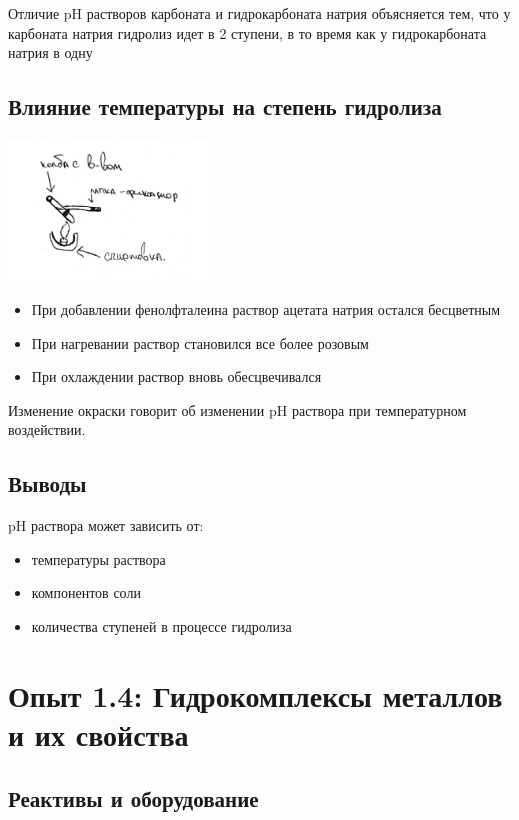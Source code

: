 \documentclass[a4paper, 12pt]{article}
\begin{document}
Отличие pH растворов карбоната и гидрокарбоната натрия объясняется тем, что у карбоната натрия гидролиз идет в 2 ступени, в то время как у гидрокарбоната натрия в одну

\subsection{Влияние температуры на степень гидролиза}
\begin{center}
	\includegraphics[width = 0.4\textwidth]{Nagrev}\\
\end{center}

\begin{itemize}
	\item При добавлении фенолфталеина раствор ацетата натрия остался бесцветным 
	\item При нагревании раствор становился все более розовым
	\item При охлаждении раствор вновь обесцвечивался
\end{itemize}

Изменение окраски говорит об изменении pH раствора при температурном воздействии.

\subsection{Выводы}
pH раствора может зависить от:
\begin{itemize}
	\item температуры раствора 
	\item компонентов соли
	\item количества ступеней в процессе гидролиза
\end{itemize}

\section{Опыт 1.4: Гидрокомплексы металлов и их свойства}

\subsection{Реактивы и оборудование}
\end{document}
